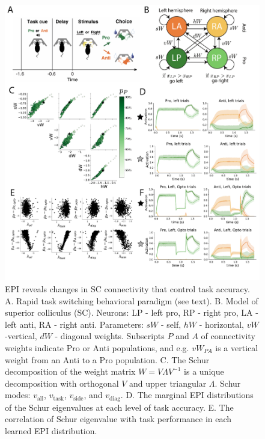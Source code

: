 \documentclass[11pt]{article}
\begin{document}
\begin{figure}
\begin{center}
\includegraphics[scale=0.5]{figs/fig4.pdf}
\end{center}
\caption{\small EPI reveals changes in SC \cite{duan2018collicular} connectivity that control task accuracy.  
A. Rapid task switching behavioral paradigm (see text). 
B. Model of superior colliculus (SC). Neurons: LP - left pro, RP - right pro, LA - left anti, RA - right anti. 
Parameters: $sW$ - self, $hW$ - horizontal, $vW$ -vertical, $dW$ - diagonal weights.  
Subscripts $P$ and $A$ of connectivity weights indicate Pro or Anti populations, and e.g. $vW_{PA}$ is a vertical weight from an Anti to a Pro population.  
C. The Schur decomposition of the weight matrix $W = V\Lambda V^{-1}$ is a unique decomposition with orthogonal $V$ and upper triangular $\Lambda$. Schur modes: $v_{\text{all}}$, $v_{\text{task}}$, $v_{\text{side}}$, and $v_{\text{diag}}$.  
D. The marginal EPI distributions of the Schur eigenvalues at each level of task accuracy.
E. The correlation of Schur eigenvalue with task performance in each learned EPI distribution.}
\label{fig:SC}
\end{figure}
\end{document}
